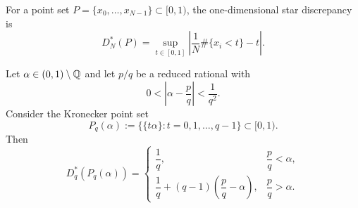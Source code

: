 For a point set $P=\{x_0,\ldots,x_{N-1}\}\subset[0,1)$, the one-dimensional star discrepancy is
\begin{equation}
D_N^\ast(P)=\sup_{t\in[0,1]}\left|\frac{1}{N}\#\{x_i<t\}-t\right|.
\end{equation}

\begin{proposition}
\label{prop:convergent_star_discrepancy}
Let $\alpha\in(0,1)\setminus\mathbb{Q}$ and let $p/q$ be a reduced rational with
\begin{equation}
0<\left|\alpha-\frac{p}{q}\right|<\frac{1}{q^2}.
\end{equation}
Consider the Kronecker point set
\begin{equation}
P_q(\alpha):=\bigl\{\{t\alpha\}: t=0,1,\ldots,q-1\bigr\}\subset[0,1).
\end{equation}
Then
\begin{equation}
D_q^\ast\!\left(P_q(\alpha)\right)=
\begin{cases}
\dfrac{1}{q}, & \dfrac{p}{q}<\alpha,\\[6pt]
\dfrac{1}{q}+(q-1)\!\left(\dfrac{p}{q}-\alpha\right), & \dfrac{p}{q}>\alpha.
\end{cases}
\end{equation}
\end{proposition}


